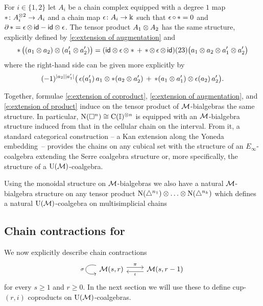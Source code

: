 For $i \in \{1,2\}$ let $A_i$ be a chain complex equipped with a degree $1$ map $\operatorname{\ast} \colon A_i^{\otimes 2} \to A_i$ and a chain map $\operatorname{\epsilon} \colon A_i \to \Bbbk$ such that $\operatorname{\epsilon} \circ \operatorname{\ast} = 0$ and $\operatorname{\partial} \operatorname{\ast} = \operatorname{\epsilon} \otimes \, \mathsf{id} - \mathsf{id} \otimes \operatorname{\epsilon}$.
The tensor product $A_1 \otimes A_2$ has the same structure, explicitly defined by \eqref{e:extension of augmentation} and
\begin{equation} \label{e:extension of product}
	\operatorname{\ast} \big( (a_1 \otimes a_2) \otimes (a_1^\prime \otimes a_2^\prime)\big) =
	(\mathsf{id} \otimes \operatorname{\epsilon} \otimes \ast \, + \, \operatorname{\ast} \otimes \operatorname{\epsilon} \otimes \, \mathsf{id})(23)
	\big( a_1 \otimes a_2 \otimes a_1^\prime \otimes a_2^\prime \big)
\end{equation}
where the right-hand side can be given more explicitly by
\[
(-1)^{\lvert a_2\rvert \lvert a_1^\prime\rvert} \big( \operatorname{\epsilon}(a_1^\prime) \, a_1 \otimes \ast (a_2 \otimes a_2^\prime)  \, + \, \operatorname{\ast}(a_1 \otimes a_1^\prime) \otimes \operatorname{\epsilon}(a_2) \, a_2^\prime \big).
\]

Together, formulae \eqref{e:extension of coproduct}, \eqref{e:extension of augmentation}, and \eqref{e:extension of product} induce on the tensor product of $\operatorname{\mathcal{M}}$-bialgebras the same structure.
In particular, $\operatorname{N}(\square^n) \cong \operatorname{C}(\mathbb{I})^{\otimes n}$ is equipped with an $\operatorname{\mathcal{M}}$-bialgebra structure induced from that in the cellular chain on the interval.
From it, a standard categorical construction -- a Kan extension along the Yoneda embedding~-- provides the chains on any cubical set with the structure of an $E_\infty$-coalgebra extending the Serre coalgebra structure or, more specifically, the structure of a $\operatorname{\mathrm{U}(\mathcal{M})}$-coalgebra.

Using the monoidal structure on $\operatorname{\mathcal{M}}$-bialgebras we also have a natural $\operatorname{\mathcal{M}}$-bialgebra structure on any tensor product $\chains(\simplex^{n_1}) \ot \dots \ot \chains(\simplex^{n_k})$ which defines a natural $\operatorname{\mathrm{U}(\mathcal{M})}$-coalgebra on multisimplicial chains \cite{gugenheim1957supercomplexes, medina2022multisimplicial}

\subsection{Chain contractions for \pdfMed} \label{ss:homology of M}

We now explicitly describe chain contractions
\[
\begin{tikzcd}
	\arrow[loop, distance=2em, in=195, out=165, "\sigma"'] \Med(s,r) \arrow[r, shift left=3pt, "\proj"] &
	\Med(s,r-1) \arrow[l, shift left=3pt, "\incl"]
\end{tikzcd}
\]
for every $s \geq 1$ and $r \geq 0$.
In the next section we will use these to define cup-$(r, i)$ coproducts on $\operatorname{\mathrm{U}(\mathcal{M})}$-coalgebras.

